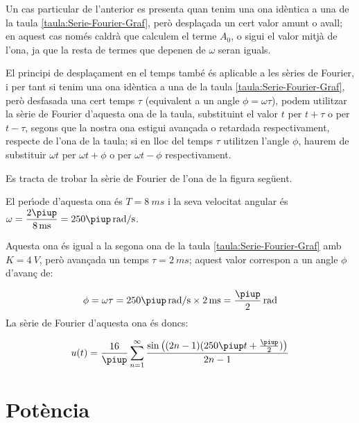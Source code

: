 Un cas particular de l'anterior es presenta quan tenim una ona  id\`{e}ntica a una de la taula \vref{taula:Serie-Fourier-Graf}, per\`{o} despla\c{c}ada un cert valor amunt o avall; en aquest cas nom\'{e}s caldr\`{a} que calculem el terme $A_0$, o sigui el valor mitj\`{a} de l'ona, ja que la resta de termes que depenen de $\omega$ seran iguals.

El principi de despla\c{c}ament en el temps tamb\'{e} \'{e}s aplicable a les s\`{e}ries de Fourier, i per tant si tenim una ona id\`{e}ntica a una de la taula \vref{taula:Serie-Fourier-Graf}, per\`{o} desfasada una cert temps $\tau$ (equivalent a un angle $\phi = \omega \tau$), podem utilitzar la s\`{e}rie de Fourier d'aquesta ona de la taula, substituint el valor $t$ per $t+\tau$ o per $t-\tau$, segons que la nostra ona estigui avan\c{c}ada o retardada respectivament, respecte de l'ona de la taula; si en lloc del temps $\tau$ utilitzen l'angle $\phi$, haurem de substituir  $\omega t$ per $\omega t + \phi$ o per $\omega t - \phi$ respectivament.


\begin{exemple}
    Es tracta de trobar la s\`{e}rie de Fourier de l'ona de la figura seg\"{u}ent.
    \begin{center}
        
    \end{center}

    El per\'{\i}ode d'aquesta ona \'{e}s $T=\SI{8}{ms}$ i la seva velocitat angular \'{e}s $\omega = \dfrac{2\piup}{\SI{8}{ms}} = 250 \piup\unit{rad/s}$.

    Aquesta ona \'{e}s igual a la segona ona de la taula \vref{taula:Serie-Fourier-Graf} amb $K=\SI{4}{V}$, per\`{o} avan\c{c}ada un temps $\tau=\SI{2}{ms}$; aquest valor correspon a un angle $\phi$ d'avan\c{c} de:

    \[
        \phi = \omega \tau = 250\piup\unit{rad/s} \times \SI{2}{ms} = \frac{\piup}{2}\unit{rad}
    \]
    La s\`{e}rie de Fourier d'aquesta ona \'{e}s doncs:

    \[
    u(t) = \frac{{16}}{\piup }\sum\limits_{n = 1}^\infty  {\frac{{\sin \big((2n - 1)(250\piup t+ \frac{\piup}{2})\big)}}{{2n - 1}}}
    \]
\end{exemple}

\section{Pot\`{e}ncia}

